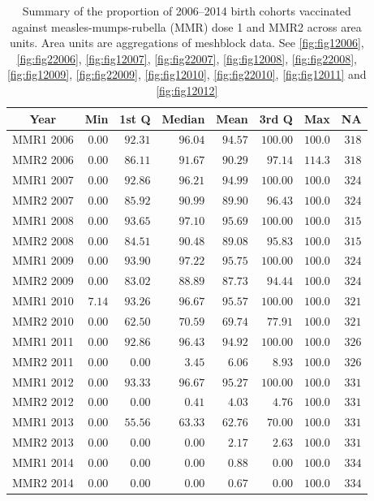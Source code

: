 \documentclass{article}
\begin{document}
 \vspace{5mm} %
\begin{table}
\begin{center}
\begin{tabular}{lrrrrrrr}
\hline\hline
\multicolumn{1}{c}{Year}&\multicolumn{1}{c}{Min}&\multicolumn{1}{c}{1st Q}&\multicolumn{1}{c}{Median}&\multicolumn{1}{c}{Mean}&\multicolumn{1}{c}{3rd Q}&\multicolumn{1}{c}{Max}&\multicolumn{1}{c}{NA}\tabularnewline
\hline
MMR1 2006&$0.00$&$92.31$&$96.04$&$94.57$&$100.00$&$100.0$&$318$\tabularnewline
MMR2 2006&$0.00$&$86.11$&$91.67$&$90.29$&$ 97.14$&$114.3$&$318$\tabularnewline
MMR1 2007&$0.00$&$92.86$&$96.21$&$94.99$&$100.00$&$100.0$&$324$\tabularnewline
MMR2 2007&$0.00$&$85.92$&$90.99$&$89.90$&$ 96.43$&$100.0$&$324$\tabularnewline
MMR1 2008&$0.00$&$93.65$&$97.10$&$95.69$&$100.00$&$100.0$&$315$\tabularnewline
MMR2 2008&$0.00$&$84.51$&$90.48$&$89.08$&$ 95.83$&$100.0$&$315$\tabularnewline
MMR1 2009&$0.00$&$93.90$&$97.22$&$95.75$&$100.00$&$100.0$&$324$\tabularnewline
MMR2 2009&$0.00$&$83.02$&$88.89$&$87.73$&$ 94.44$&$100.0$&$324$\tabularnewline
MMR1 2010&$7.14$&$93.26$&$96.67$&$95.57$&$100.00$&$100.0$&$321$\tabularnewline
MMR2 2010&$0.00$&$62.50$&$70.59$&$69.74$&$ 77.91$&$100.0$&$321$\tabularnewline
MMR1 2011&$0.00$&$92.86$&$96.43$&$94.92$&$100.00$&$100.0$&$326$\tabularnewline
MMR2 2011&$0.00$&$ 0.00$&$ 3.45$&$ 6.06$&$  8.93$&$100.0$&$326$\tabularnewline
MMR1 2012&$0.00$&$93.33$&$96.67$&$95.27$&$100.00$&$100.0$&$331$\tabularnewline
MMR2 2012&$0.00$&$ 0.00$&$ 0.41$&$ 4.03$&$  4.76$&$100.0$&$331$\tabularnewline
MMR1 2013&$0.00$&$55.56$&$63.33$&$62.76$&$ 70.00$&$100.0$&$331$\tabularnewline
MMR2 2013&$0.00$&$ 0.00$&$ 0.00$&$ 2.17$&$  2.63$&$100.0$&$331$\tabularnewline
MMR1 2014&$0.00$&$ 0.00$&$ 0.00$&$ 0.88$&$  0.00$&$100.0$&$334$\tabularnewline
MMR2 2014&$0.00$&$ 0.00$&$ 0.00$&$ 0.67$&$  0.00$&$100.0$&$334$\tabularnewline
\hline
\end{tabular}\end{center}\caption{Summary of the proportion of 2006--2014 birth cohorts vaccinated against measles-mumps-rubella (MMR) dose 1 and MMR2 across area units. Area units are aggregations of meshblock data. See \autoref{fig:fig12006}, \autoref{fig:fig22006}, \autoref{fig:fig12007}, \autoref{fig:fig22007}, \autoref{fig:fig12008}, \autoref{fig:fig22008}, \autoref{fig:fig12009}, \autoref{fig:fig22009}, \autoref{fig:fig12010}, \autoref{fig:fig22010}, \autoref{fig:fig12011} and \autoref{fig:fig12012}}
\label{table:tab_mmr_nir}
\end{table}
\end{document}
